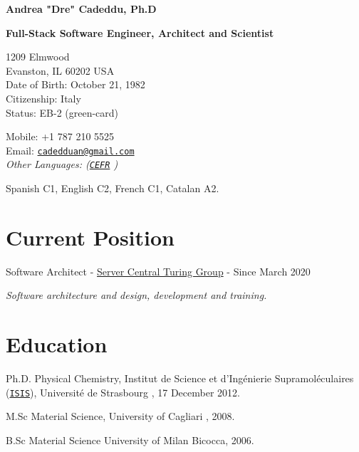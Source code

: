 \documentclass[11pt,letterpaper]{article}
\def\name{Andrea "Dre" Cadeddu, Ph.D }
\renewenvironment{itemize}{
  \begin{list}{}{
    \setlength{\leftmargin}{1.5em}
  }
}{
  \end{list}
}
\begin{document}
{\huge \bf \name}

\vspace{0.25in}
{\Large \bf \sffamily Full-Stack Software Engineer, Architect and Scientist}

\vspace{0.25in}

\begin{minipage}[t]{0.5\textwidth}
  1209 Elmwood\\
Evanston, IL 60202
  USA \\
  Date of Birth: October 21, 1982 \\
  Citizenship: Italy\\
  Status: EB-2 (green-card)
\end{minipage}
\begin{minipage}[t]{0.5\textwidth}
  Mobile: +1 787 210 5525\\
  Email: \href{mailto:cadedduan@gmail.com}{\tt cadedduan@gmail.com} \\
  \textit{Other Languages: (\href{http://en.wikipedia.org/wiki/Common_European_Framework_of_Reference_for_Languages}{\tt CEFR} )} 

Spanish C1,
English C2, 
French C1,
Catalan A2.

\end{minipage}

\section*{Current Position}

\begin{itemize}

\item Software Architect - \href{https://www.servercentral.com}{Server Central Turing Group} - Since March 2020 

\textit{Software architecture and design, development and training.}
\end{itemize}
\section*{Education}

\begin{itemize}

  \item  Ph.D. Physical Chemistry, Institut de Science et d'Ing\'enierie Supramol\'eculaires (\href{http://www-isis.u-strasbg.fr/}{\texttt{ISIS}}), Universit\'e de Strasbourg , 17 December 2012.

  \item  M.Sc Material Science, University of Cagliari , 2008.

  \item B.Sc Material Science University of Milan Bicocca, 2006.
  
\end{itemize}
\end{document}
